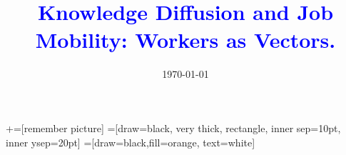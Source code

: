 \documentclass[notes,11pt, aspectratio=169]{beamer}
\title[]{\textcolor{blue}{Knowledge Diffusion and Job Mobility: Workers as Vectors.}}
\author[SJH]{}
\institute[LSE]{\bgroup{\def\arraystretch{1.5}
	\small{\begin{tabular}{c}
	Stephan Hobler  \\
	London School of Economics \\
\end{tabular}}}\egroup}
\date{\today}
\begin{document}
\newcommand\marktopleft[1]{%
    \tikz[overlay,remember picture] 
        \node (marker-#1-a) at (-.3em,.5em) {};%
}
\newcommand\markbottomright[2]{%
    \tikz[overlay,remember picture] 
        \node (marker-#1-b) at (0em,0em) {};%
}
+=[remember picture] 
 =[draw=black, very thick, rectangle, inner sep=10pt, inner ysep=20pt]
 =[draw=black,fill=orange, text=white]

\begin{frame}
\maketitle
\end{frame}
\end{document}

